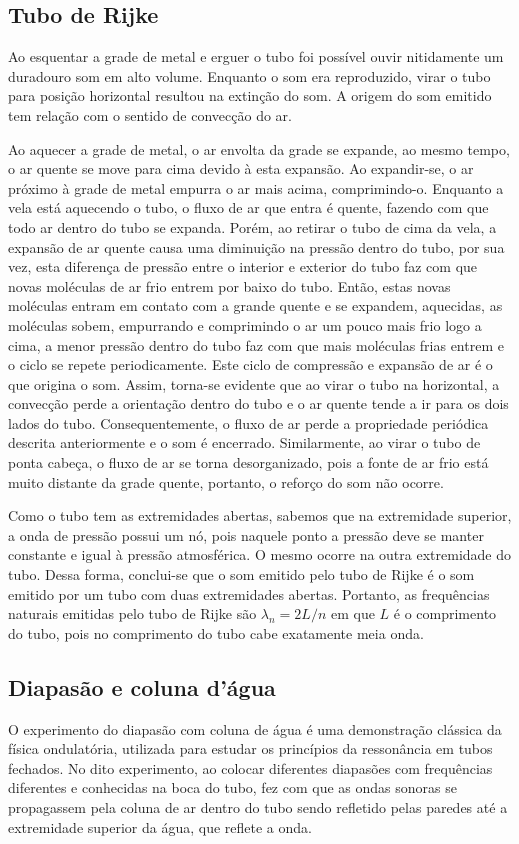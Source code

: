 \subsection{Tubo de Rijke}

Ao esquentar a grade de metal e erguer o tubo foi possível ouvir nitidamente um duradouro som em alto volume. Enquanto o som era reproduzido, virar o tubo para posição horizontal resultou na extinção do som. A origem do som emitido tem relação com o sentido de convecção do ar.

Ao aquecer a grade de metal, o ar envolta da grade se expande, ao mesmo tempo, o ar quente se move para cima devido à esta expansão. Ao expandir-se, o ar próximo à grade de metal empurra o ar mais acima, comprimindo-o. Enquanto a vela está aquecendo o tubo, o fluxo de ar que entra é quente, fazendo com que todo ar dentro do tubo se expanda. Porém, ao retirar o tubo de cima da vela, a expansão de ar quente causa uma diminuição na pressão dentro do tubo, por sua vez, esta diferença de pressão entre o interior e exterior do tubo faz com que novas moléculas de ar frio entrem por baixo do tubo. Então, estas novas moléculas entram em contato com a grande quente e se expandem, aquecidas, as moléculas sobem, empurrando e comprimindo o ar um pouco mais frio logo a cima, a menor pressão dentro do tubo faz com que mais moléculas frias entrem e o ciclo se repete periodicamente. Este ciclo de compressão e expansão de ar é o que origina o som. Assim, torna-se evidente que ao virar o tubo na horizontal, a convecção perde a orientação dentro do tubo e o ar quente tende a ir para os dois lados do tubo. Consequentemente, o fluxo de ar perde a propriedade periódica descrita anteriormente e o som é encerrado. Similarmente, ao virar o tubo de ponta cabeça, o fluxo de ar se torna desorganizado, pois a fonte de ar frio está muito distante da grade quente, portanto, o reforço do som não ocorre.

Como o tubo tem as extremidades abertas, sabemos que na extremidade superior, a onda de pressão possui um nó, pois naquele ponto a pressão deve se manter constante e igual à pressão atmosférica. O mesmo ocorre na outra extremidade do tubo. Dessa forma, conclui-se que o som emitido pelo tubo de Rijke é o som emitido por um tubo com duas extremidades abertas. Portanto, as frequências naturais emitidas pelo tubo de Rijke são \(\lambda_n = 2L/n\) em que \(L\) é o comprimento do tubo, pois no comprimento do tubo cabe exatamente meia onda. 

\subsection{Diapasão e coluna d'água}
O experimento do diapasão com coluna de água é uma demonstração clássica da física ondulatória, utilizada para estudar os princípios da ressonância em tubos fechados. No dito experimento, ao colocar diferentes diapasões com frequências diferentes e conhecidas na boca do tubo, fez com que as ondas sonoras se propagassem pela coluna de ar dentro do tubo sendo refletido pelas paredes até a extremidade superior da água, que reflete a onda. 

